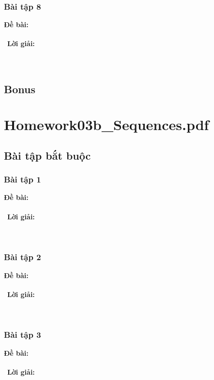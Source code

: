 \documentclass[a4paper]{article}
\begin{document}
\subsubsection{Bài tập 8}
\textbf{Đề bài:} 
\\\ \\\
\textbf{Lời giải:} \\\ \\\
\clearpage
\subsection{Bonus}
\clearpage

\section{Homework03b\_Sequences.pdf}
\subsection{Bài tập bắt buộc}
\subsubsection{Bài tập 1}
\textbf{Đề bài:} 
\\\ \\\
\textbf{Lời giải:} \\\ \\\
\clearpage
\subsubsection{Bài tập 2}
\textbf{Đề bài:} 
\\\ \\\
\textbf{Lời giải:} \\\ \\\
\clearpage
\subsubsection{Bài tập 3}
\textbf{Đề bài:} 
\\\ \\\
\textbf{Lời giải:} \\\ \\\
\clearpage
\end{document}
